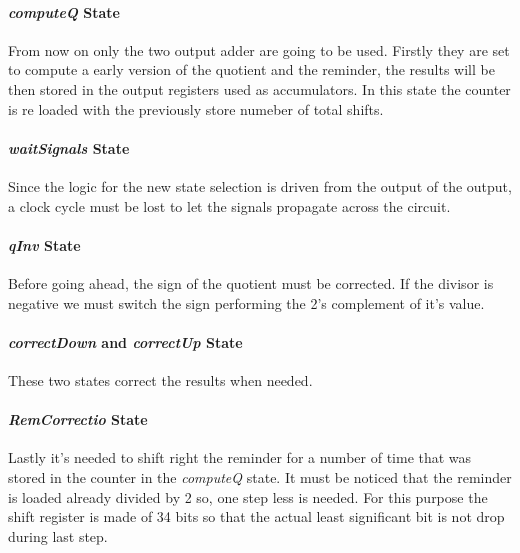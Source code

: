 \paragraph{\textit{computeQ} State}
From now on only the two output adder are going to be used. Firstly they are set to compute a early version of the quotient and the reminder, the results will be then stored in the output registers used as accumulators. In this state the counter is re loaded with the previously store numeber of total shifts.
\paragraph{\textit{waitSignals} State}
Since the logic for the new state selection is driven from the output of the output, a clock cycle must be lost to let the signals propagate across the circuit. 
\paragraph{\textit{qInv} State}
Before going ahead, the sign of the quotient must be corrected. If the divisor is negative we must switch the sign performing the 2's complement of it's value.
\paragraph{\textit{correctDown} and \textit{correctUp} State}
These two states correct the results when needed.
\paragraph{\textit{RemCorrectio} State}
Lastly it's needed to shift right the reminder for a number of time that was stored in the counter in the \textit{computeQ} state. It must be noticed that the reminder is loaded already divided by 2 so, one step less is needed. For this purpose the shift register is made of 34 bits so that the actual least significant bit is not drop during last step.
